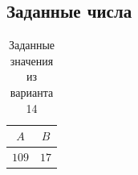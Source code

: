 \subsection*{Заданные числа}

\begin{table}[H]
    \centering
    \caption{Заданные значения из варианта 14}
    \begin{tabular}{|c|c|}
		$A$ & $B$ \\
		\hline
		$109$ & $17$  \\
		
    \end{tabular}
\end{table}

